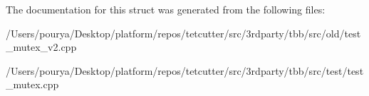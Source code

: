The documentation for this struct was generated from the following files\+:\begin{DoxyCompactItemize}
\item 
/\+Users/pourya/\+Desktop/platform/repos/tetcutter/src/3rdparty/tbb/src/old/test\+\_\+mutex\+\_\+v2.\+cpp\item 
/\+Users/pourya/\+Desktop/platform/repos/tetcutter/src/3rdparty/tbb/src/test/test\+\_\+mutex.\+cpp\end{DoxyCompactItemize}
